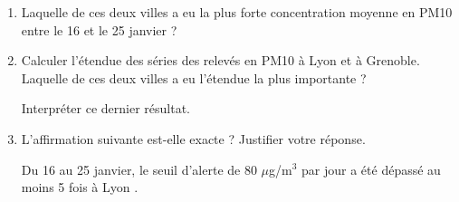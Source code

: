 \medskip

\begin{enumerate}
\item Laquelle de ces deux villes a eu la plus forte concentration moyenne en PM10 entre le 16 et le 25 janvier ?
\item Calculer l'étendue des séries des relevés en PM10 à Lyon et à Grenoble. Laquelle de ces deux villes a eu l'étendue la plus importante ? 

Interpréter ce dernier résultat.
\item L'affirmation suivante est-elle exacte ? Justifier votre réponse.

\og Du 16 au 25 janvier, le seuil d'alerte de 80 $\mu$g/m$^3$ par jour a été dépassé au moins 5 fois à Lyon \fg.
\end{enumerate}

\bigskip

